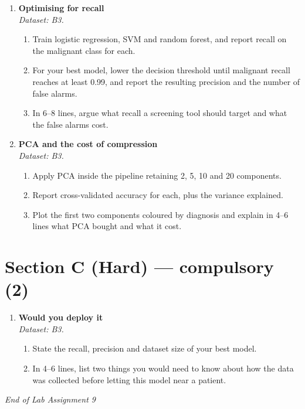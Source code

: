 \documentclass[11pt,a4paper]{article}
\begin{document}
\begin{enumerate}[label=\textbf{B\arabic*.}, leftmargin=*]

  \item \textbf{Optimising for recall} \\
    \emph{Dataset: B3.}
    \begin{enumerate}[label=(\alph*), leftmargin=*]
      \item Train logistic regression, SVM and random forest, and report recall on the malignant class for each.
      \item For your best model, lower the decision threshold until malignant recall reaches at least 0.99, and report the resulting precision and the number of false alarms.
      \item In 6--8 lines, argue what recall a screening tool should target and what the false alarms cost.
    \end{enumerate}

  \item \textbf{PCA and the cost of compression} \\
    \emph{Dataset: B3.}
    \begin{enumerate}[label=(\alph*), leftmargin=*]
      \item Apply PCA inside the pipeline retaining 2, 5, 10 and 20 components.
      \item Report cross-validated accuracy for each, plus the variance explained.
      \item Plot the first two components coloured by diagnosis and explain in 4--6 lines what PCA bought and what it cost.
    \end{enumerate}

\end{enumerate}

\section*{Section C (Hard) --- compulsory \quad (2)}

\begin{enumerate}[label=\textbf{C\arabic*.}, leftmargin=*]

  \item \textbf{Would you deploy it} \\
    \emph{Dataset: B3.}
    \begin{enumerate}[label=(\alph*), leftmargin=*]
      \item State the recall, precision and dataset size of your best model.
      \item In 4--6 lines, list two things you would need to know about how the data was collected before letting this model near a patient.
    \end{enumerate}

\end{enumerate}

\vfill\noindent\textit{End of Lab Assignment 9}

\notesources{\AMLLabSources}
\end{document}
